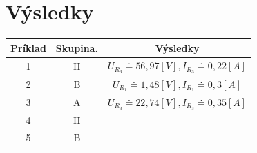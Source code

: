 \documentclass{article}
\begin{document}
\part*{Výsledky}
\vspace{50px}
\begin{center}
	\begin{tabular}{| c | c | c |}
		\hline
		\textbf{Príklad} & \textbf{Skupina.} & \textbf{Výsledky}                                  \\
		\hline
		1                 & H                 & $U_{R_3} \doteq 56,97[V], I_{R_3} \doteq 0,22[A]$   \\
		\hline
		2                 & B                 & $U_{R_1} \doteq 1,48 [V], I_{R_1} \doteq 0,3 [A]$   \\
		\hline
		3                 & A                 & $U_{R_3} \doteq 22,74 [V], I_{R_3} \doteq 0,35 [A]$ \\
		\hline
		4                 & H                 &                                                     \\
		\hline
		5                 & B                 &                                                     \\
		\hline
	\end{tabular}
\end{center}
\end{document}
